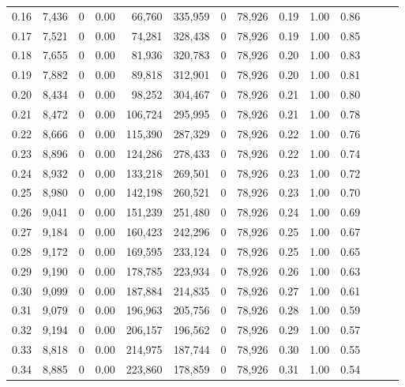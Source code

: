 \begin{tabular}{rrrrrrrrrrrrrr}
0.16 &  7,436 &      0 &  0.00 &   66,760 &  335,959 &       0 &  78,926 &  0.19 &  1.00 &      0.86 \\
0.17 &  7,521 &      0 &  0.00 &   74,281 &  328,438 &       0 &  78,926 &  0.19 &  1.00 &      0.85 \\
0.18 &  7,655 &      0 &  0.00 &   81,936 &  320,783 &       0 &  78,926 &  0.20 &  1.00 &      0.83 \\
0.19 &  7,882 &      0 &  0.00 &   89,818 &  312,901 &       0 &  78,926 &  0.20 &  1.00 &      0.81 \\
0.20 &  8,434 &      0 &  0.00 &   98,252 &  304,467 &       0 &  78,926 &  0.21 &  1.00 &      0.80 \\
0.21 &  8,472 &      0 &  0.00 &  106,724 &  295,995 &       0 &  78,926 &  0.21 &  1.00 &      0.78 \\
0.22 &  8,666 &      0 &  0.00 &  115,390 &  287,329 &       0 &  78,926 &  0.22 &  1.00 &      0.76 \\
0.23 &  8,896 &      0 &  0.00 &  124,286 &  278,433 &       0 &  78,926 &  0.22 &  1.00 &      0.74 \\
0.24 &  8,932 &      0 &  0.00 &  133,218 &  269,501 &       0 &  78,926 &  0.23 &  1.00 &      0.72 \\
0.25 &  8,980 &      0 &  0.00 &  142,198 &  260,521 &       0 &  78,926 &  0.23 &  1.00 &      0.70 \\
0.26 &  9,041 &      0 &  0.00 &  151,239 &  251,480 &       0 &  78,926 &  0.24 &  1.00 &      0.69 \\
0.27 &  9,184 &      0 &  0.00 &  160,423 &  242,296 &       0 &  78,926 &  0.25 &  1.00 &      0.67 \\
0.28 &  9,172 &      0 &  0.00 &  169,595 &  233,124 &       0 &  78,926 &  0.25 &  1.00 &      0.65 \\
0.29 &  9,190 &      0 &  0.00 &  178,785 &  223,934 &       0 &  78,926 &  0.26 &  1.00 &      0.63 \\
0.30 &  9,099 &      0 &  0.00 &  187,884 &  214,835 &       0 &  78,926 &  0.27 &  1.00 &      0.61 \\
0.31 &  9,079 &      0 &  0.00 &  196,963 &  205,756 &       0 &  78,926 &  0.28 &  1.00 &      0.59 \\
0.32 &  9,194 &      0 &  0.00 &  206,157 &  196,562 &       0 &  78,926 &  0.29 &  1.00 &      0.57 \\
0.33 &  8,818 &      0 &  0.00 &  214,975 &  187,744 &       0 &  78,926 &  0.30 &  1.00 &      0.55 \\
0.34 &  8,885 &      0 &  0.00 &  223,860 &  178,859 &       0 &  78,926 &  0.31 &  1.00 &      0.54 \\

\end{tabular}
